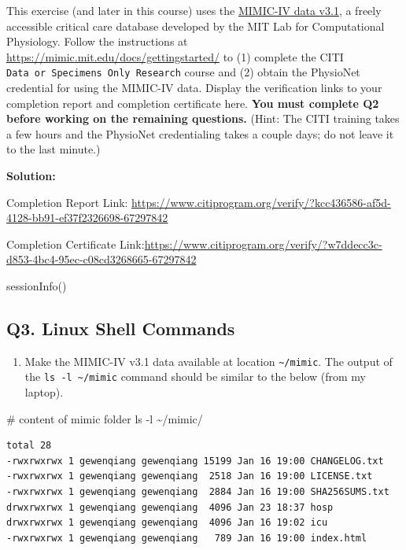 \documentclass[
]{article}
\newenvironment{Shaded}{\begin{snugshade}}{\end{snugshade}}
\newcommand{\AttributeTok}[1]{\textcolor[rgb]{0.40,0.45,0.13}{#1}}
\newcommand{\CommentTok}[1]{\textcolor[rgb]{0.37,0.37,0.37}{#1}}
\newcommand{\FunctionTok}[1]{\textcolor[rgb]{0.28,0.35,0.67}{#1}}
\newcommand{\NormalTok}[1]{\textcolor[rgb]{0.00,0.23,0.31}{#1}}
\providecommand{\tightlist}{%
  \setlength{\itemsep}{0pt}\setlength{\parskip}{0pt}}\usepackage{longtable,booktabs,array}
\begin{document}
This exercise (and later in this course) uses the
\href{https://physionet.org/content/mimiciv/3.1/}{MIMIC-IV data v3.1}, a
freely accessible critical care database developed by the MIT Lab for
Computational Physiology. Follow the instructions at
\url{https://mimic.mit.edu/docs/gettingstarted/} to (1) complete the
CITI \texttt{Data\ or\ Specimens\ Only\ Research} course and (2) obtain
the PhysioNet credential for using the MIMIC-IV data. Display the
verification links to your completion report and completion certificate
here. \textbf{You must complete Q2 before working on the remaining
questions.} (Hint: The CITI training takes a few hours and the PhysioNet
credentialing takes a couple days; do not leave it to the last minute.)

\textbf{Solution:}

Completion Report Link:
\url{https://www.citiprogram.org/verify/?kcc436586-af5d-4128-bb91-ef37f2326698-67297842}

Completion Certificate
Link:\url{https://www.citiprogram.org/verify/?w7ddecc3c-d853-4bc4-95ec-c08cd3268665-67297842}

sessionInfo()

\hypertarget{q3.-linux-shell-commands}{%
\subsection{Q3. Linux Shell Commands}\label{q3.-linux-shell-commands}}

\begin{enumerate}
\def\labelenumi{\arabic{enumi}.}
\tightlist
\item
  Make the MIMIC-IV v3.1 data available at location
  \texttt{\textasciitilde{}/mimic}. The output of the
  \texttt{ls\ -l\ \textasciitilde{}/mimic} command should be similar to
  the below (from my laptop).
\end{enumerate}

\begin{Shaded}
\begin{Highlighting}[]
\CommentTok{\# content of mimic folder}
\FunctionTok{ls} \AttributeTok{{-}l}\NormalTok{ \textasciitilde{}/mimic/}
\end{Highlighting}
\end{Shaded}

\begin{verbatim}
total 28
-rwxrwxrwx 1 gewenqiang gewenqiang 15199 Jan 16 19:00 CHANGELOG.txt
-rwxrwxrwx 1 gewenqiang gewenqiang  2518 Jan 16 19:00 LICENSE.txt
-rwxrwxrwx 1 gewenqiang gewenqiang  2884 Jan 16 19:00 SHA256SUMS.txt
drwxrwxrwx 1 gewenqiang gewenqiang  4096 Jan 23 18:37 hosp
drwxrwxrwx 1 gewenqiang gewenqiang  4096 Jan 16 19:02 icu
-rwxrwxrwx 1 gewenqiang gewenqiang   789 Jan 16 19:00 index.html
\end{verbatim}
\end{document}
